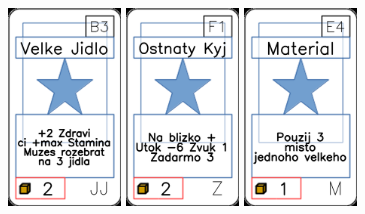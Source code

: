 \documentclass[a4paper]{article}
\begin{document}
	\includegraphics[width=3.0cm]{img-1_37}
	\includegraphics[width=3.0cm]{img-1_85}
	\includegraphics[width=3.0cm]{img-1_53}
\end{document}
